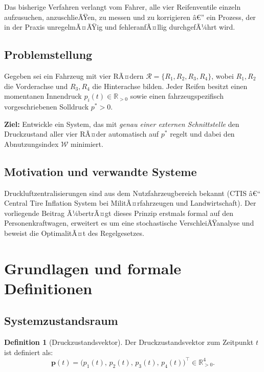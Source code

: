 ﻿\documentclass[a4paper,12pt]{article}
\theoremstyle{definition}
\newtheorem{definition}{Definition}
\begin{document}
Das bisherige Verfahren verlangt vom Fahrer, alle vier Reifenventile einzeln
aufzusuchen, anzuschlieÃŸen, zu messen und zu korrigieren â€” ein Prozess, der
in der Praxis unregelmÃ¤ÃŸig und fehleranfÃ¤llig durchgefÃ¼hrt wird.

\subsection{Problemstellung}

Gegeben sei ein Fahrzeug mit vier RÃ¤dern
$\mathcal{R} = \{R_1, R_2, R_3, R_4\}$, wobei $R_1, R_2$ die Vorderachse und
$R_3, R_4$ die Hinterachse bilden. Jeder Reifen besitzt einen momentanen
Innendruck $p_i(t) \in \mathbb{R}_{>0}$ sowie einen fahrzeugspezifisch
vorgeschriebenen Solldruck $p^* > 0$.

\textbf{Ziel:} Entwickle ein System, das mit \emph{genau einer externen
Schnittstelle} den Druckzustand aller vier RÃ¤der automatisch auf $p^*$
regelt und dabei den Abnutzungsindex $\mathcal{W}$ minimiert.

\subsection{Motivation und verwandte Systeme}

Druckluftzentralisierungen sind aus dem Nutzfahrzeugbereich bekannt
(CTIS â€“ Central Tire Inflation System bei MilitÃ¤rfahrzeugen und Landwirtschaft).
Der vorliegende Beitrag Ã¼bertrÃ¤gt dieses Prinzip erstmals formal auf den
Personenkraftwagen, erweitert es um eine stochastische VerschleiÃŸanalyse
und beweist die OptimalitÃ¤t des Regelgesetzes.

\section{Grundlagen und formale Definitionen}

\subsection{Systemzustandsraum}

\begin{definition}[Druckzustandsvektor]
Der Druckzustandsvektor zum Zeitpunkt $t$ ist definiert als:
\[
    \mathbf{p}(t) = \bigl(p_1(t),\, p_2(t),\, p_3(t),\, p_4(t)\bigr)^{\top}
    \in \mathbb{R}_{>0}^4.
\]
\end{definition}
\end{document}
